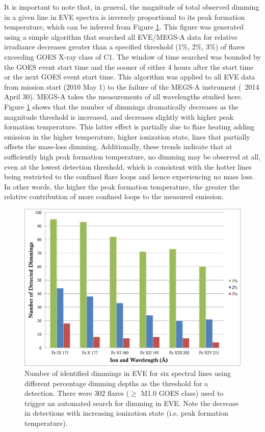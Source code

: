 It is important to note that, in general, the magnitude of total observed dimming in a given line in EVE spectra is inversely proportional to its peak formation temperature, which can be inferred from Figure \ref{detectedDimmingVsIonization}. This figure was generated using a simple algorithm that searched all EVE/MEGS-A data for relative irradiance decreases greater than a specified threshold (1\%, 2\%, 3\%) of flares exceeding GOES X-ray class of C1. The window of time searched was bounded by the GOES event start time and the sooner of either 4 hours after the start time or the next GOES event start time. This algorithm was applied to all EVE data from mission start (2010 May 1) to the failure of the MEGS-A instrument (~2014 April 30). MEGS-A takes the measurements of all wavelengths studied here. Figure \ref{detectedDimmingVsIonization} shows that the number of dimmings dramatically decreases as the magnitude threshold is increased, and decreases slightly with higher peak formation temperature. This latter effect is partially due to flare heating adding emission in the higher temperature, higher ionization state, lines that partially offsets the mass-loss dimming. Additionally, these trends indicate that at sufficiently high peak formation temperature, no dimming may be observed at all, even at the lowest detection threshold, which is consistent with the hotter lines being restricted to the confined flare loops and hence experiencing no mass loss. In other words, the higher the peak formation temperature, the greater the relative contribution of more confined loops to the measured emission. 

\begin{figure}[!h]
    \caption[Dimming dependence on temperature in EVE]{
        Number of identified dimmings in EVE for six spectral lines using different percentage dimming depths as the
        threshold for a detection. There were 302 flares ($\geq$ M1.0 GOES class) used to trigger an automated search for dimming in EVE. 
        Note the decrease in detections with increasing ionization state (i.e. peak formation temperature).
    }
    \begin{center}
        \includegraphics[width=150mm]{Images/DetectedDimmingVsIonization.png}
    \end{center}
    \label{detectedDimmingVsIonization}
\end{figure}

